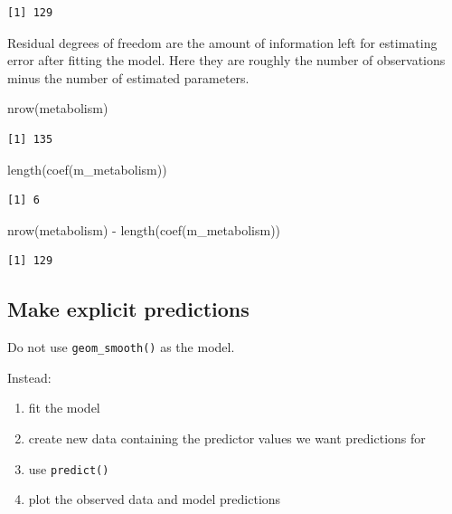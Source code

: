 \documentclass[
  letterpaper,
  8pt,
  a4paper]{book}
\newenvironment{Shaded}{\begin{snugshade}}{\end{snugshade}}
\newcommand{\FunctionTok}[1]{\textcolor[rgb]{0.28,0.35,0.67}{#1}}
\newcommand{\NormalTok}[1]{\textcolor[rgb]{0.00,0.23,0.31}{#1}}
\newcommand{\SpecialCharTok}[1]{\textcolor[rgb]{0.37,0.37,0.37}{#1}}
\providecommand{\tightlist}{%
  \setlength{\itemsep}{0pt}\setlength{\parskip}{0pt}}
\begin{document}
\begin{verbatim}
[1] 129
\end{verbatim}

Residual degrees of freedom are the amount of information left for
estimating error after fitting the model. Here they are roughly the
number of observations minus the number of estimated parameters.

\begin{Shaded}
\begin{Highlighting}[]
\FunctionTok{nrow}\NormalTok{(metabolism)}
\end{Highlighting}
\end{Shaded}

\begin{verbatim}
[1] 135
\end{verbatim}

\begin{Shaded}
\begin{Highlighting}[]
\FunctionTok{length}\NormalTok{(}\FunctionTok{coef}\NormalTok{(m\_metabolism))}
\end{Highlighting}
\end{Shaded}

\begin{verbatim}
[1] 6
\end{verbatim}

\begin{Shaded}
\begin{Highlighting}[]
\FunctionTok{nrow}\NormalTok{(metabolism) }\SpecialCharTok{{-}} \FunctionTok{length}\NormalTok{(}\FunctionTok{coef}\NormalTok{(m\_metabolism))}
\end{Highlighting}
\end{Shaded}

\begin{verbatim}
[1] 129
\end{verbatim}

\subsection*{Make explicit predictions}\label{make-explicit-predictions}

Do not use \texttt{geom\_smooth()} as the model.

Instead:

\begin{enumerate}
\def\labelenumi{\arabic{enumi}.}
\tightlist
\item
  fit the model
\item
  create new data containing the predictor values we want predictions
  for
\item
  use \texttt{predict()}
\item
  plot the observed data and model predictions
\end{enumerate}
\end{document}
